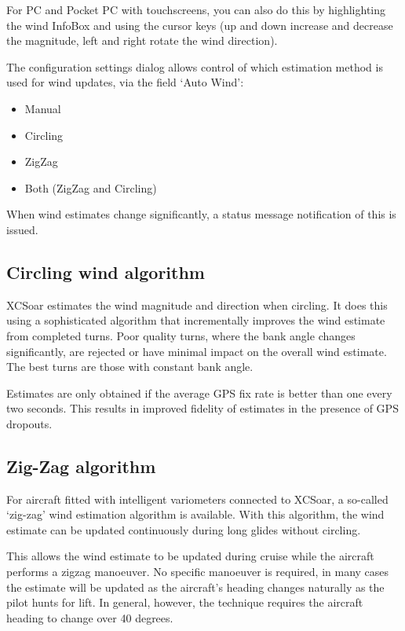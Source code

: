 \documentclass[a4paper,12pt]{refrep}
\newcommand{\InfoBox}[0]{{InfoBox}}
\begin{document}
For PC and Pocket PC with touchscreens, you can
also do this by highlighting the wind {\InfoBox} and using the cursor
keys (up and down increase and decrease the magnitude, left and right
rotate the wind direction).

The configuration settings dialog allows control of which estimation 
method is used for wind updates, via the field `Auto Wind':
\begin{itemize}
\item Manual
\item Circling
\item ZigZag
\item Both (ZigZag and Circling)
\end{itemize}

When wind estimates change significantly, a status message
notification of this is issued.

\subsection*{Circling wind algorithm}

XCSoar estimates the wind magnitude and direction when circling.  It
does this using a sophisticated algorithm that incrementally improves
the wind estimate from completed turns.  Poor quality turns, where
the bank angle changes significantly, are rejected or have minimal
impact on the overall wind estimate.  The best turns are those with
constant bank angle.

Estimates are only obtained if the average GPS fix rate is better than
one every two seconds.  This results in improved fidelity of estimates
in the presence of GPS dropouts.


\subsection*{Zig-Zag algorithm}

For aircraft fitted with intelligent variometers connected to XCSoar,
a so-called `zig-zag' wind estimation algorithm is available.  With
this algorithm, the wind estimate can be updated continuously during
long glides without circling.

This allows the wind estimate to be updated during cruise while the
aircraft performs a zigzag manoeuver.  No specific manoeuver is
required, in many cases the estimate will be updated as the aircraft's
heading changes naturally as the pilot hunts for lift.  In general,
however, the technique requires the aircraft heading to change over 40
degrees.
\end{document}
